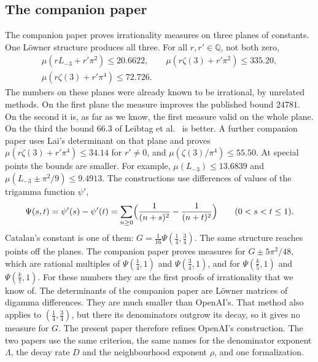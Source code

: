 \documentclass[11pt]{amsart}
\theoremstyle{definition}
\theoremstyle{remark}
\numberwithin{equation}{section}
\newcommand{\Q}{\mathbb Q}
\begin{document}
\subsection{The companion paper}
The companion paper \cite{Litsey2026b} proves irrationality measures on three planes of constants. One
L\"owner structure produces all three. For all $r,r'\in\Q$, not both zero,
\begin{gather*}
 \mu(rL_{-3}+r'\pi^2)\le20.6622,\qquad\mu(r\zeta(3)+r'\pi^2)\le335.20,\\
 \mu(r\zeta(3)+r'\pi^4)\le72.726.
\end{gather*}
The numbers on these planes were already known to be irrational, by unrelated methods. On the first plane the
measure improves the published bound $24781$. On the second it is, as far as we know, the first measure valid on
the whole plane. On the third the bound $66.3$ of Leibtag et al.\ \cite{LBKWSK26} is better. A further
companion paper \cite{Litsey2026d} uses Lai's determinant on that plane and proves $\mu(r\zeta(3)+r'\pi^4)\le34.14$
for $r'\ne0$, and $\mu(\zeta(3)/\pi^4)\le55.50$. At special points the bounds are smaller. For
example, $\mu(L_{-3})\le13.6839$ and $\mu(L_{-3}\pm\pi^2/9)\le9.4913$. The constructions use differences of values of the trigamma function
$\psi'$,
\[
 \Psi(s,t)=\psi'(s)-\psi'(t)=\sum_{n\ge0}\Bigl(\frac1{(n+s)^2}-\frac1{(n+t)^2}\Bigr)\qquad(0<s<t\le1).
\]
Catalan's constant is one of them: $G=\frac1{16}\Psi(\frac14,\frac34)$. The same structure reaches points off the planes.
The companion paper proves measures for $G\pm5\pi^2/48$, which are rational multiples of $\Psi(\frac14,1)$ and $\Psi(\frac34,1)$, and for
$\Psi(\frac k5,1)$ and $\Psi(\frac k7,1)$. For these numbers they are the first proofs of irrationality that
we know of. The determinants of the companion paper are L\"owner matrices of digamma differences. They are
much smaller than OpenAI's. That method also applies to $(\frac14,\frac34)$, but there its
denominators outgrow its decay, so it gives no measure for $G$. The present paper therefore refines
OpenAI's construction. The two papers use the same criterion, the same names for the denominator exponent
$\Lambda$, the decay rate $D$ and the neighbourhood exponent $\rho$, and one formalization.
\end{document}
